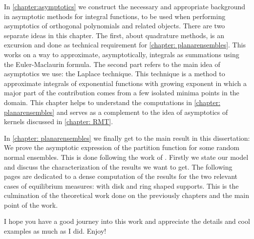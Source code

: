 In \autoref{chapter:asymptotics} we construct the necessary and appropriate background in asymptotic methods for integral functions, to be used when performing asymptotics of orthogonal polynomials and related objects. There are two separate ideas in this chapter. The first, about quadrature methods, is an excursion and done as technical requirement for \autoref{chapter: planarensembles}. This works on a way to approximate, asymptotically, integrals as summations using the Euler-Maclaurin formula. The second part refers to the main idea of asymptotics we use: the Laplace technique. This technique is a method to approximate integrals of exponential functions with growing exponent in which a major part of the contribution comes from a few isolated minima points in the domain. This chapter helps to understand the computations in \autoref{chapter: planarensembles} and serves as a complement to the idea of asymptotics of kernels discussed in \autoref{chapter: RMT}.

In \autoref{chapter: planarensembles} we finally get to the main result in this dissertation: We prove the asymptotic expression of the partition function for some random normal ensembles. This is done following the work of . Firstly we state our model and discuss the characterization of the results we want to get. The following pages are dedicated to a dense computation of the results for the two relevant cases of equilibrium measures: with disk and ring shaped supports. This is the culmination of the theoretical work done on the previously chapters and the main point of the work.

I hope you have a good journey into this work and appreciate the details and cool examples as much as I did. Enjoy!




